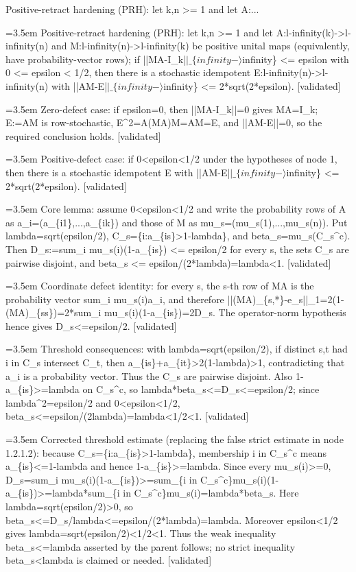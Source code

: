 \documentclass{article}
\newcommand{\step}[1]{\par\noindent\hangindent=3.5em\hangafter=1%
  \makebox[3.5em][l]{\textbf{#1.}}}
\newcommand{\steptag}[1]{\hfill{\small\textsf{[#1]}}}
\begin{document}
\begin{proofbox}{Positive-retract hardening (PRH): let k,n >= 1 and let A:...}
\step{1} Positive-retract hardening (PRH): let k,n >= 1 and let A:l-infinity(k)->l-infinity(n) and M:l-infinity(n)->l-infinity(k) be positive unital maps (equivalently, have probability-vector rows); if ||MA-I\_k|$|\_\{infinity-\rangle$infinity\} <= epsilon with 0 <= epsilon < 1/2, then there is a stochastic idempotent E:l-infinity(n)->l-infinity(n) with ||AM-E|$|\_\{infinity-\rangle$infinity\} <= 2*sqrt(2*epsilon). \steptag{validated} \\[6pt]
\step{1.1} Zero-defect case: if epsilon=0, then ||MA-I\_k||=0 gives MA=I\_k; E:=AM is row-stochastic, E\textasciicircum{}2=A(MA)M=AM=E, and ||AM-E||=0, so the required conclusion holds. \steptag{validated} \\[4pt]
\step{1.2} Positive-defect case: if 0<epsilon<1/2 under the hypotheses of node 1, then there is a stochastic idempotent E with ||AM-E|$|\_\{infinity-\rangle$infinity\} <= 2*sqrt(2*epsilon). \steptag{validated} \\[6pt]
\step{1.2.1} Core lemma: assume 0<epsilon<1/2 and write the probability rows of A as a\_i=(a\_\{i1\},...,a\_\{ik\}) and those of M as mu\_s=(mu\_s(1),...,mu\_s(n)). Put lambda=sqrt(epsilon/2), C\_s=\{i:a\_\{is\}>1-lambda\}, and beta\_s=mu\_s(C\_s\textasciicircum{}c). Then D\_s:=sum\_i mu\_s(i)(1-a\_\{is\}) <= epsilon/2 for every s, the sets C\_s are pairwise disjoint, and beta\_s <= epsilon/(2*lambda)=lambda<1. \steptag{validated} \\[6pt]
\step{1.2.1.1} Coordinate defect identity: for every s, the s-th row of MA is the probability vector sum\_i mu\_s(i)a\_i, and therefore ||(MA)\_\{s,*\}-e\_s||\_1=2(1-(MA)\_\{ss\})=2*sum\_i mu\_s(i)(1-a\_\{is\})=2D\_s. The operator-norm hypothesis hence gives D\_s<=epsilon/2. \steptag{validated} \\[4pt]
\step{1.2.1.2} Threshold consequences: with lambda=sqrt(epsilon/2), if distinct s,t had i in C\_s intersect C\_t, then a\_\{is\}+a\_\{it\}>2(1-lambda)>1, contradicting that a\_i is a probability vector. Thus the C\_s are pairwise disjoint. Also 1-a\_\{is\}>=lambda on C\_s\textasciicircum{}c, so lambda*beta\_s<=D\_s<=epsilon/2; since lambda\textasciicircum{}2=epsilon/2 and 0<epsilon<1/2, beta\_s<=epsilon/(2lambda)=lambda<1/2<1. \steptag{validated} \\[4pt]
\step{1.2.1.3} Corrected threshold estimate (replacing the false strict estimate in node 1.2.1.2): because C\_s=\{i:a\_\{is\}>1-lambda\}, membership i in C\_s\textasciicircum{}c means a\_\{is\}<=1-lambda and hence 1-a\_\{is\}>=lambda. Since every mu\_s(i)>=0, D\_s=sum\_i mu\_s(i)(1-a\_\{is\})>=sum\_\{i in C\_s\textasciicircum{}c\}mu\_s(i)(1-a\_\{is\})>=lambda*sum\_\{i in C\_s\textasciicircum{}c\}mu\_s(i)=lambda*beta\_s. Here lambda=sqrt(epsilon/2)>0, so beta\_s<=D\_s/lambda<=epsilon/(2*lambda)=lambda. Moreover epsilon<1/2 gives lambda=sqrt(epsilon/2)<1/2<1. Thus the weak inequality beta\_s<=lambda asserted by the parent follows; no strict inequality beta\_s<lambda is claimed or needed. \steptag{validated} \\[4pt]

\end{proofbox}
\end{document}
